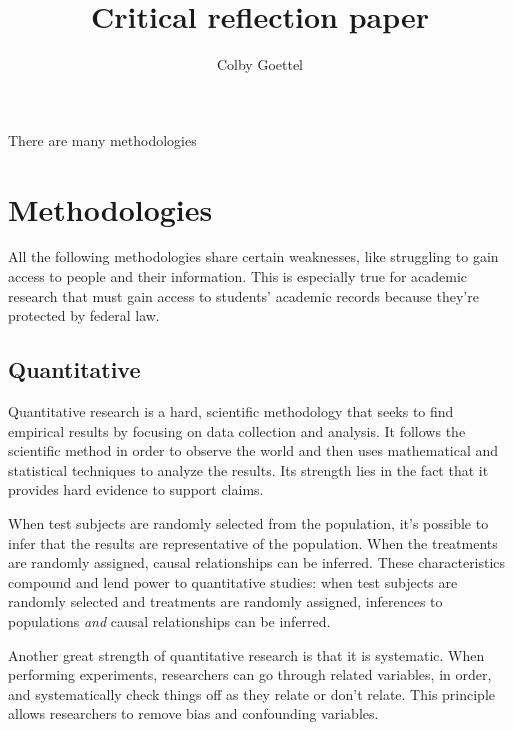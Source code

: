 \documentclass[man,natbib]{apa6}
\title{Critical reflection paper}
\author{Colby Goettel}
\affiliation{Brigham Young University}
\begin{document}
\maketitle

There are many methodologies 

\section{Methodologies}
All the following methodologies share certain weaknesses, like struggling to gain access to people and their information. This is especially true for academic research that must gain access to students' academic records because they're protected by federal law.

\subsection{Quantitative}
Quantitative research is a hard, scientific methodology that seeks to find empirical results by focusing on data collection and analysis. It follows the scientific method in order to observe the world and then uses mathematical and statistical techniques to analyze the results. Its strength lies in the fact that it provides hard evidence to support claims.

When test subjects are randomly selected from the population, it's possible to infer that the results are representative of the population. When the treatments are randomly assigned, causal relationships can be inferred. These characteristics compound and lend power to quantitative studies: when test subjects are randomly selected and treatments are randomly assigned, inferences to populations \emph{and} causal relationships can be inferred.

Another great strength of quantitative research is that it is systematic. When performing experiments, researchers can go through related variables, in order, and systematically check things off as they relate or don't relate. This principle allows researchers to remove bias and confounding variables.
\end{document}
